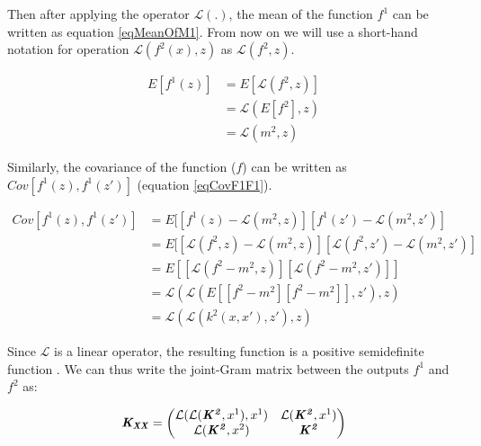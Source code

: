 Then after applying the operator $\mathcal{L}(.)$, the mean of the function $f^1$ can be written as equation \ref{eqMeanOfM1}. From now on we will use a short-hand notation for operation $\mathcal{L}\left ( f^{2}(x), z \right )$ as $\mathcal{L}\left ( f^{2}, z \right )$.

\begin{equation}\label{eqMeanOfM1}
\begin{aligned}
E[f^1(z)]   & = E[\mathcal{L}\left ( f^{2}, z \right )] \\
            & = \mathcal{L}(E[f^{2}], z) \\
            & = \mathcal{L}(m^2, z)
\end{aligned}
\end{equation}

Similarly, the covariance of the function ($f$) can be written as $Cov[f^1(z), f^1(z')]$ (equation \ref{eqCovF1F1}). 

\begin{equation}\label{eqCovF1F1}
\begin{aligned}
Cov[f^1(z), f^1(z')]   & = E[[f^{1}(z) - \mathcal{L}(m^2, z)][f^{1}(z') - \mathcal{L}(m^2, z')] \\
            & = E[[\mathcal{L}\left ( f^{2}, z \right ) - \mathcal{L}(m^2, z)][\mathcal{L}\left ( f^{2}, z' \right ) - \mathcal{L}(m^2, z')] \\ 
            & = E[[\mathcal{L}\left ( f^{2} - m^2 , z \right )][\mathcal{L}\left ( f^{2} - m^2, z' \right )]] \\
            & = \mathcal{L}\left(\mathcal{L}\left(E[[f^{2} - m^2][f^{2} - m^2]], z'\right) , z\right) \\
            & = \mathcal{L}\left(\mathcal{L}\left(k^2(x, x'), z'\right) , z\right)
\end{aligned}
\end{equation}

Since $\mathcal{L}$ is a linear operator, the resulting function is a positive semidefinite function \cite{ginsbourger2013invariances, sarkka2011linear}. We can thus write the joint-Gram matrix between the outputs $f^1$ and $f^2$ as:

\begin{equation}\label{eqLinearJointCovariance}
    \bm{\mathit{K_{XX}}} = \begin{pmatrix}
    \mathcal{L}(\mathcal{L}(\bm{\mathit{K^2}}, x^{1}), x^{1}) & \mathcal{L}(\bm{\mathit{K^2}}, x^{1})\\ \mathcal{L}(\bm{\mathit{K^2}}, x^{2}) & \bm{\mathit{K^2}}
    \end{pmatrix} 
\end{equation}

